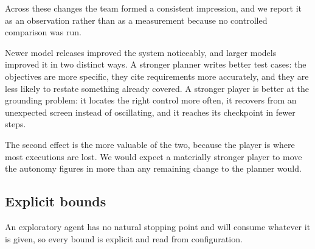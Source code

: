 Across these changes the team formed a consistent impression, and we report it
as an observation rather than as a measurement because no controlled comparison
was run.

Newer model releases improved the system noticeably, and larger models improved
it in two distinct ways. A stronger planner writes better test cases: the
objectives are more specific, they cite requirements more accurately, and they
are less likely to restate something already covered. A stronger player is
better at the grounding problem: it locates the right control more often, it
recovers from an unexpected screen instead of oscillating, and it reaches its
checkpoint in fewer steps.

The second effect is the more valuable of the two, because the player is where
most executions are lost. We would expect a materially stronger player to move
the autonomy figures in  more than any remaining change to
the planner would.


\subsection{Explicit bounds}

An exploratory agent has no natural stopping point and will consume whatever it
is given, so every bound is explicit and read from configuration.

